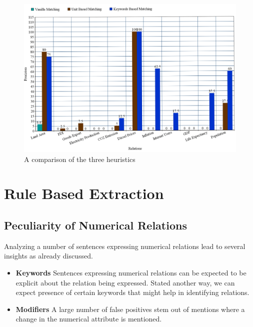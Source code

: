 \documentclass[a4paper,10pt]{article}
\begin{document}
\begin{figure}[H]
 \centering
 \includegraphics[bb=0 0 1360 1000,scale=0.25]{./results.png}
 \caption{A comparison of the three heuristics}
 \label{fig:comp}
\end{figure}



\section{Rule Based Extraction}

\subsection{Peculiarity of Numerical Relations}
Analyzing a number of sentences expressing numerical relations lead to several insights as already discussed.
\begin{itemize}
 \item \textbf{Keywords} Sentences expressing numerical relations can be expected to be explicit about the relation being expressed.
 Stated another way, we can expect presence of certain keywords that might help in identifying relations.
 \item \textbf{Modifiers} A large number of false positives stem out of mentions where a change in the numerical attribute is mentioned.
\end{itemize}
\end{document}
